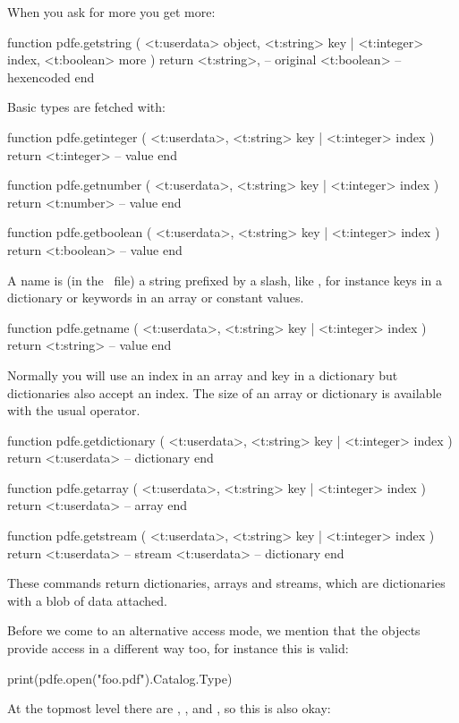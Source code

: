 When you ask for more you get more:

\starttyping[option=LUA]
function pdfe.getstring (
    <t:userdata> object,
    <t:string>   key | <t:integer> index,
    <t:boolean>  more
)
    return
        <t:string>, -- original
        <t:boolean>  -- hexencoded
end
\stoptyping

Basic types are fetched with:

\starttyping[option=LUA]
function pdfe.getinteger ( <t:userdata>, <t:string> key | <t:integer> index )
    return <t:integer> -- value
end

function pdfe.getnumber ( <t:userdata>, <t:string> key | <t:integer> index )
    return <t:number> -- value
end

function pdfe.getboolean ( <t:userdata>, <t:string> key | <t:integer> index )
    return <t:boolean> -- value
end
\stoptyping

A name is (in the \PDF\ file) a string prefixed by a slash, like , for instance keys in a dictionary or keywords in
an array or constant values.

\starttyping[option=LUA]
function pdfe.getname ( <t:userdata>, <t:string> key | <t:integer> index )
    return <t:string> -- value
end
\stoptyping

Normally you will use an index in an array and key in a dictionary but dictionaries
also accept an index. The size of an array or dictionary is available with the
usual \type {#} operator.

\starttyping[option=LUA]
function pdfe.getdictionary ( <t:userdata>, <t:string> key | <t:integer> index )
    return <t:userdata> -- dictionary
end

function pdfe.getarray ( <t:userdata>, <t:string> key | <t:integer> index )
    return <t:userdata> -- array
end

function pdfe.getstream ( <t:userdata>, <t:string> key | <t:integer> index )
    return
        <t:userdata> -- stream
        <t:userdata> -- dictionary
end
\stoptyping

These commands return dictionaries, arrays and streams, which are dictionaries
with a blob of data attached.

Before we come to an alternative access mode, we mention that the objects provide
access in a different way too, for instance this is valid:

\starttyping[option=LUA]
print(pdfe.open("foo.pdf").Catalog.Type)
\stoptyping

At the topmost level there are , , 
and , so this is also okay:

